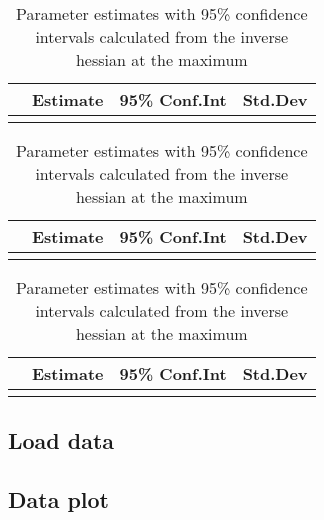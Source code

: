 \begin{table}[htb]
    \centering
    \begin{tabular}{lr|rr|r}
         & \multicolumn{1}{r}{Estimate} & \multicolumn{2}{c}{95\% Conf.Int} & Std.Dev \\\hline
        } \\
    \end{tabular}
    \caption{Parameter estimates with 95\% confidence intervals calculated from the inverse hessian at the maximum}
    \label{tbl:2-state-parameter-confidence}
\end{table}

\begin{table}[htb]
    \centering
    \begin{tabular}{lr|rr|r}
         & \multicolumn{1}{r}{Estimate} & \multicolumn{2}{c}{95\% Conf.Int} & Std.Dev \\\hline
        } \\
    \end{tabular}
    \caption{Parameter estimates with 95\% confidence intervals calculated from the inverse hessian at the maximum}
    \label{tbl:3-state-parameter-confidence}
\end{table}

\begin{table}[htb]
    \centering
    \begin{tabular}{lr|rr|r}
         & \multicolumn{1}{r}{Estimate} & \multicolumn{2}{c}{95\% Conf.Int} & Std.Dev \\\hline
        } \\
    \end{tabular}
    \caption{Parameter estimates with 95\% confidence intervals calculated from the inverse hessian at the maximum}
    \label{tbl:4-state-parameter-confidence}
\end{table}

\FloatBarrier

\subsection{Load data}


\subsection{Data plot}



